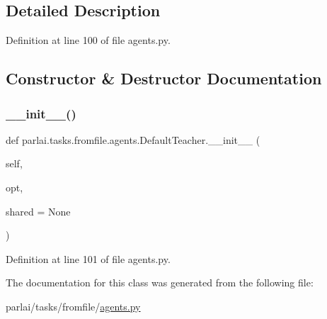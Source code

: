 \subsection{Detailed Description}


Definition at line 100 of file agents.\+py.



\subsection{Constructor \& Destructor Documentation}
\mbox{\label{classparlai_1_1tasks_1_1fromfile_1_1agents_1_1DefaultTeacher_a4193d0c62cc2b0a602b6b53cf34e43f1}} 
\subsubsection{\texorpdfstring{\+\_\+\+\_\+init\+\_\+\+\_\+()}{\_\_init\_\_()}}
{\footnotesize\ttfamily def parlai.\+tasks.\+fromfile.\+agents.\+Default\+Teacher.\+\_\+\+\_\+init\+\_\+\+\_\+ (\begin{DoxyParamCaption}\item[{}]{self,  }\item[{}]{opt,  }\item[{}]{shared = {\ttfamily None} }\end{DoxyParamCaption})}



Definition at line 101 of file agents.\+py.



The documentation for this class was generated from the following file\+:\begin{DoxyCompactItemize}
\item 
parlai/tasks/fromfile/\hyperlink{parlai_2tasks_2fromfile_2agents_8py}{agents.\+py}\end{DoxyCompactItemize}
